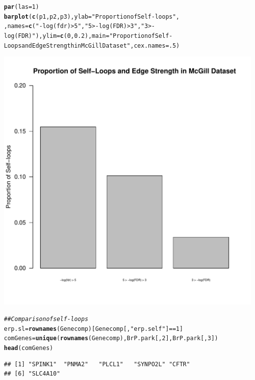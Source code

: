 \documentclass{article}\usepackage[]{graphicx}\usepackage[]{color}
\makeatletter
\def\maxwidth{ %
  \ifdim\Gin@nat@width>\linewidth
    \linewidth
  \else
    \Gin@nat@width
  \fi
}
\newcommand{\hlnum}[1]{\textcolor[rgb]{0.686,0.059,0.569}{#1}}%
\newcommand{\hlstr}[1]{\textcolor[rgb]{0.192,0.494,0.8}{#1}}%
\newcommand{\hlcom}[1]{\textcolor[rgb]{0.678,0.584,0.686}{\textit{#1}}}%
\newcommand{\hlopt}[1]{\textcolor[rgb]{0,0,0}{#1}}%
\newcommand{\hlstd}[1]{\textcolor[rgb]{0.345,0.345,0.345}{#1}}%
\newcommand{\hlkwb}[1]{\textcolor[rgb]{0.69,0.353,0.396}{#1}}%
\newcommand{\hlkwc}[1]{\textcolor[rgb]{0.333,0.667,0.333}{#1}}%
\newcommand{\hlkwd}[1]{\textcolor[rgb]{0.737,0.353,0.396}{\textbf{#1}}}%
\newenvironment{kframe}{%
 \def\at@end@of@kframe{}%
 \ifinner\ifhmode%
  \def\at@end@of@kframe{\end{minipage}}%
  \begin{minipage}{\columnwidth}%
 \fi\fi%
 \def\FrameCommand##1{\hskip\@totalleftmargin \hskip-\fboxsep
 \colorbox{shadecolor}{##1}\hskip-\fboxsep
     \hskip-\linewidth \hskip-\@totalleftmargin \hskip\columnwidth}%
 \MakeFramed {\advance\hsize-\width
   \@totalleftmargin\z@ \linewidth\hsize
   \@setminipage}}%
 {\par\unskip\endMakeFramed%
 \at@end@of@kframe}
\newenvironment{knitrout}{}{} %
\makeatother
\begin{document}
\begin{knitrout}
\begin{kframe}
\begin{alltt}
\hlkwd{par}\hlstd{(}\hlkwc{las}\hlstd{=}\hlnum{1}\hlstd{)}
\hlkwd{barplot}\hlstd{(}\hlkwd{c}\hlstd{(p1,p2,p3),}\hlkwc{ylab}\hlstd{=}\hlstr{"Proportion of Self-loops"}\hlstd{,}
  \hlstd{,}\hlkwc{names}\hlstd{=}\hlkwd{c}\hlstd{(}\hlstr{"-log(fdr) > 5"}\hlstd{,}\hlstr{"5 > -log(FDR) > 3"}\hlstd{,}\hlstr{"3 > -log(FDR)"}\hlstd{),}\hlkwc{ylim}\hlstd{=}\hlkwd{c}\hlstd{(}\hlnum{0}\hlstd{,}\hlnum{0.2}\hlstd{),}\hlkwc{main}\hlstd{=}\hlstr{"Proportion of Self-Loops and Edge Strength in McGill Dataset"}\hlstd{,}\hlkwc{cex.names}\hlstd{=}\hlnum{.5}\hlstd{)}
\end{alltt}
\end{kframe}
\includegraphics[width=\maxwidth]{figure/Park_Validation_Analysis-2} 
\begin{kframe}\begin{alltt}
\hlcom{## Comparison of self-loops}
\hlstd{erp.sl}\hlkwb{=}\hlkwd{rownames}\hlstd{(Genecomp)[Genecomp[,}\hlstr{"erp.self"}\hlstd{]}\hlopt{==}\hlnum{1}\hlstd{]}
\hlstd{comGenes}\hlkwb{=}\hlkwd{unique}\hlstd{(}\hlkwd{rownames}\hlstd{(Genecomp),BrP.park[,}\hlnum{2}\hlstd{],BrP.park[,}\hlnum{3}\hlstd{])}
\hlkwd{head}\hlstd{(comGenes)}
\end{alltt}
\begin{verbatim}
## [1] "SPINK1"  "PNMA2"   "PLCL1"   "SYNPO2L" "CFTR"   
## [6] "SLC4A10"
\end{verbatim}

\end{kframe}
\end{knitrout}
\end{document}
